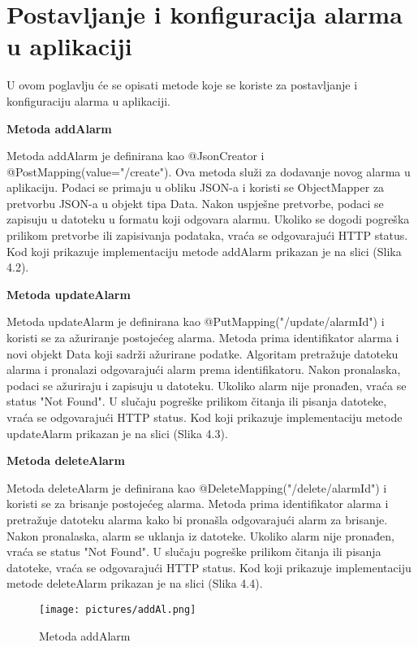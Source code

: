 \documentclass[times, utf8, zavrsni]{fer}
\begin{document}
\section{Postavljanje i konfiguracija alarma u aplikaciji}
U ovom poglavlju će se opisati metode koje se koriste za postavljanje i konfiguraciju alarma u aplikaciji.



\textbf{Metoda addAlarm}

Metoda {\selectfont addAlarm} je definirana kao @JsonCreator i @PostMapping(value="/create"). Ova metoda služi za dodavanje novog alarma u aplikaciju. Podaci se primaju u obliku JSON-a i koristi se ObjectMapper za pretvorbu JSON-a u objekt tipa Data. Nakon uspješne pretvorbe, podaci se zapisuju u datoteku u formatu koji odgovara alarmu. Ukoliko se dogodi pogreška prilikom pretvorbe ili zapisivanja podataka, vraća se odgovarajući HTTP status. Kod koji prikazuje implementaciju metode {\selectfont addAlarm} prikazan je na slici (Slika 4.2).

\vspace{\baselineskip}

\textbf{Metoda updateAlarm}

Metoda {\selectfont updateAlarm} je definirana kao @PutMapping("/update/{alarmId}") i koristi se za ažuriranje postojećeg alarma. Metoda prima identifikator alarma i novi objekt Data koji sadrži ažurirane podatke. Algoritam pretražuje datoteku alarma i pronalazi odgovarajući alarm prema identifikatoru. Nakon pronalaska, podaci se ažuriraju i zapisuju u datoteku. Ukoliko alarm nije pronađen, vraća se status "Not Found". U slučaju pogreške prilikom čitanja ili pisanja datoteke, vraća se odgovarajući HTTP status. Kod koji prikazuje implementaciju metode {\selectfont updateAlarm} prikazan je na slici (Slika 4.3).

\vspace{\baselineskip}

\textbf{Metoda deleteAlarm}

Metoda {\selectfont deleteAlarm} je definirana kao @DeleteMapping("/delete/{alarmId}") i koristi se za brisanje postojećeg alarma. Metoda prima identifikator alarma i pretražuje datoteku alarma kako bi pronašla odgovarajući alarm za brisanje. Nakon pronalaska, alarm se uklanja iz datoteke. Ukoliko alarm nije pronađen, vraća se status "Not Found". U slučaju pogreške prilikom čitanja ili pisanja datoteke, vraća se odgovarajući HTTP status. Kod koji prikazuje implementaciju metode {\selectfont deleteAlarm} prikazan je na slici (Slika 4.4).
\begin{figure}[h!]
			\texttt{[image: pictures/addAl.png]} %
		\centering
			\caption{Metoda addAlarm}
			\label{fig:promjene}
\end{figure}
\end{document}
